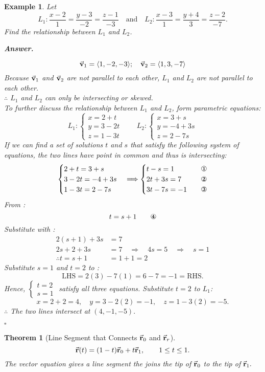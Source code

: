 \documentclass[12pt,a4paper]{article}
\newtheorem{thm}{Theorem}[subsection]
\newtheorem{eg}{Example}[subsection]
\newenvironment*{ans}{\par\indent\textbf{\textit{Answer. }}\par}{\par\hfill{$\square$}\par}
\def\vecv{\va{v}}
\def\vecr{\va{{\textbf{r}}}}
\begin{document}
\begin{eg}
	Let \[L_1: \frac{x-2}{1}=\frac{y-3}{-2}=\frac{z-1}{-3}\quad\text{and}\quad L_2: \frac{x-3}{1}=\frac{y+4}{3}=\frac{z-2}{-7}.\] Find the relationship between $L_1$ and $L_2$.
	\begin{ans}
		\[\vecv_1=\langle1,-2,-3\rangle;\quad\vecv_2=\langle1,3,-7\rangle\]	 Because $\vecv_1$ and $\vecv_2$ are not parallel to each other, $L_1$ and $L_2$ are not parallel to each other. \\
		$\therefore$ $L_1$ and $L_2$ can only be intersecting or skewed. \\ 
		To further discuss the relationship between $L_1$ and $L_2$, form parametric equations: 
		\[L_1: \begin{cases}x=2+t\\y=3-2t\\z=1-3t\end{cases}\qquad L_2: \begin{cases}x=3+s\\y=-4+3s\\z=2-7s\end{cases}\]
		If we can find a set of solutions $t$ and $s$ that satisfy the following system of equations, the two lines have point in common and thus is intersecting: \[\begin{cases}2+t=3+s\\3-2t=-4+3s\\1-3t=2-7s\end{cases}\Longrightarrow\begin{cases}t-s=1\quad&\text{\ding{172}}\\2t+3s=7\quad&\text{\ding{173}}\\3t-7s=-1\quad&\text{\ding{174}}\end{cases}\]
		From : \[t=s+1\qquad\text{\ding{175}}\]
		Substitute  with : $$\begin{aligned}
			2(s+1)+3s&=7\\
			2s+2+3s&=7\quad\Rightarrow\quad4s=5\quad\Rightarrow\quad s=1\\
			\therefore t=s+1&=1+1=2
		\end{aligned}$$
		Substitute $s=1$ and $t=2$ to : \[\text{LHS}=2(3)-7(1)=6-7=-1=\text{RHS}.\]
		Hence, $\begin{cases}t=2\\s=1\end{cases}$ satisfy all three equations. Substitute $t=2$ to $L_1$: \[x=2+2=4,\quad y=3-2(2)=-1,\quad z=1-3(2)=-5.\]
		$\therefore$ The two lines intersect at $(4,-1,-5).$
	\end{ans}
\end{eg}
\begin{thm}[Line Segment that Connects $\vecr_0$ and $\vecr_r$]
\[\vecr(t)=(1-t)\vecr_0+t\vecr_1,\qquad1\leq t\leq1.\] The vector equation gives a line segment the joins the tip of $\vecr_0$ to the tip of $\vecr_1.$
\end{thm}
\end{document}
